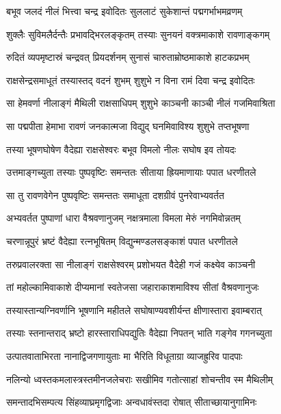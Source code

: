 \twolineshloka
{बभूव जलदं नीलं भित्त्वा चन्द्र इवोदितः}
{सुललाटं सुकेशान्तं पद्मगर्भाभमव्रणम्} %

\twolineshloka
{शुक्लैः सुविमलैर्दन्तैः प्रभावद्भिरलङ्कृतम्}
{तस्याः सुनयनं वक्त्रमाकाशे रावणाङ्कगम्} %

\twolineshloka
{रुदितं व्यपमृष्टास्रं चन्द्रवत् प्रियदर्शनम्}
{सुनासं चारुताम्रोष्ठमाकाशे हाटकप्रभम्} %

\twolineshloka
{राक्षसेन्द्रसमाधूतं तस्यास्तद् वदनं शुभम्}
{शुशुभे न विना रामं दिवा चन्द्र इवोदितः} %

\twolineshloka
{सा हेमवर्णा नीलाङ्गं मैथिली राक्षसाधिपम्}
{शुशुभे काञ्चनी काञ्ची नीलं गजमिवाश्रिता} %

\twolineshloka
{सा पद्मपीता हेमाभा रावणं जनकात्मजा}
{विद्युद् घनमिवाविश्य शुशुभे तप्तभूषणा} %

\twolineshloka
{तस्या भूषणघोषेण वैदेह्या राक्षसेश्वरः}
{बभूव विमलो नीलः सघोष इव तोयदः} %

\twolineshloka
{उत्तमाङ्गच्युता तस्याः पुष्पवृष्टिः समन्ततः}
{सीताया ह्रियमाणायाः पपात धरणीतले} %

\twolineshloka
{सा तु रावणवेगेन पुष्पवृष्टिः समन्ततः}
{समाधूता दशग्रीवं पुनरेवाभ्यवर्तत} %

\twolineshloka
{अभ्यवर्तत पुष्पाणां धारा वैश्रवणानुजम्}
{नक्षत्रमाला विमला मेरुं नगमिवोन्नतम्} %

\twolineshloka
{चरणान्नूपुरं भ्रष्टं वैदेह्या रत्नभूषितम्}
{विद्युन्मण्डलसङ्काशं पपात धरणीतले} %

\twolineshloka
{तरुप्रवालरक्ता सा नीलाङ्गं राक्षसेश्वरम्}
{प्रशोभयत वैदेही गजं कक्ष्येव काञ्चनी} %

\twolineshloka
{तां महोल्कामिवाकाशे दीप्यमानां स्वतेजसा}
{जहाराकाशमाविश्य सीतां वैश्रवणानुजः} %

\twolineshloka
{तस्यास्तान्यग्निवर्णानि भूषणानि महीतले}
{सघोषाण्यवशीर्यन्त क्षीणास्तारा इवाम्बरात्} %

\twolineshloka
{तस्याः स्तनान्तराद् भ्रष्टो हारस्ताराधिपद्युतिः}
{वैदेह्या निपतन् भाति गङ्गेव गगनच्युता} %

\twolineshloka
{उत्पातवाताभिरता नानाद्विजगणायुताः}
{मा भैरिति विधूताग्रा व्याजह्रुरिव पादपाः} %

\twolineshloka
{नलिन्यो ध्वस्तकमलास्त्रस्तमीनजलेचराः}
{सखीमिव गतोत्साहां शोचन्तीव स्म मैथिलीम्} %

\twolineshloka
{समन्तादभिसम्पत्य सिंहव्याघ्रमृगद्विजाः}
{अन्वधावंस्तदा रोषात् सीताच्छायानुगामिनः} %

